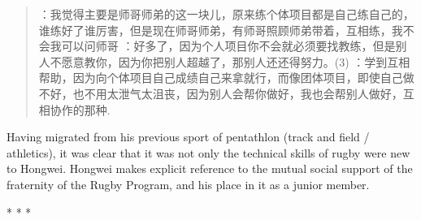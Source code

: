 \begin{CJK}{UTF8}{gbsn}
  \begin{quotation}
    ：我觉得主要是师哥师弟的这一块儿，原来练个体项目都是自己练自己的，谁练好了谁厉害，但是现在师哥师弟，有师哥照顾师弟带着，互相练，我不会我可以问师哥
    ：好多了，因为个人项目你不会就必须要找教练，但是别人不愿意教你，因为你把别人超越了，那别人还还得努力。(3) ：学到互相帮助，因为向个体项目自己成绩自己来拿就行，而像团体项目，即使自己做不好，也不用太泄气太沮丧，因为别人会帮你做好，我也会帮别人做好，互相协作的那种.
  \end{quotation}
\end{CJK}

Having migrated from his previous sport of pentathlon (track and field / athletics), it was clear that it was not only the technical skills of rugby were new to Hongwei.  Hongwei makes explicit reference to the mutual social support of the fraternity of the Rugby Program, and his place in it as a junior member.

\begin{center}
  * * *
\end{center}



